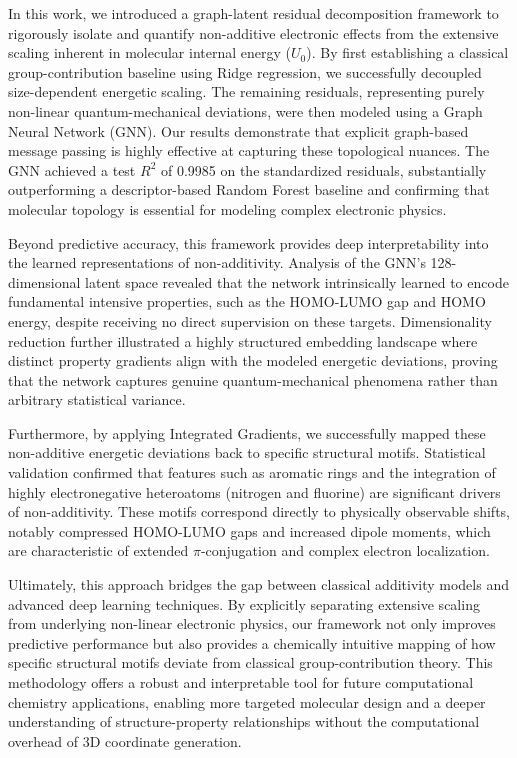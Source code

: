 \documentclass[]{article}
\begin{document}
In this work, we introduced a graph-latent residual decomposition framework to rigorously isolate and quantify non-additive electronic effects from the extensive scaling inherent in molecular internal energy ($U_0$). By first establishing a classical group-contribution baseline using Ridge regression, we successfully decoupled size-dependent energetic scaling. The remaining residuals, representing purely non-linear quantum-mechanical deviations, were then modeled using a Graph Neural Network (GNN). Our results demonstrate that explicit graph-based message passing is highly effective at capturing these topological nuances. The GNN achieved a test $R^2$ of 0.9985 on the standardized residuals, substantially outperforming a descriptor-based Random Forest baseline and confirming that molecular topology is essential for modeling complex electronic physics.

Beyond predictive accuracy, this framework provides deep interpretability into the learned representations of non-additivity. Analysis of the GNN's 128-dimensional latent space revealed that the network intrinsically learned to encode fundamental intensive properties, such as the HOMO-LUMO gap and HOMO energy, despite receiving no direct supervision on these targets. Dimensionality reduction further illustrated a highly structured embedding landscape where distinct property gradients align with the modeled energetic deviations, proving that the network captures genuine quantum-mechanical phenomena rather than arbitrary statistical variance.

Furthermore, by applying Integrated Gradients, we successfully mapped these non-additive energetic deviations back to specific structural motifs. Statistical validation confirmed that features such as aromatic rings and the integration of highly electronegative heteroatoms (nitrogen and fluorine) are significant drivers of non-additivity. These motifs correspond directly to physically observable shifts, notably compressed HOMO-LUMO gaps and increased dipole moments, which are characteristic of extended $\pi$-conjugation and complex electron localization. 

Ultimately, this approach bridges the gap between classical additivity models and advanced deep learning techniques. By explicitly separating extensive scaling from underlying non-linear electronic physics, our framework not only improves predictive performance but also provides a chemically intuitive mapping of how specific structural motifs deviate from classical group-contribution theory. This methodology offers a robust and interpretable tool for future computational chemistry applications, enabling more targeted molecular design and a deeper understanding of structure-property relationships without the computational overhead of 3D coordinate generation.
\end{document}
